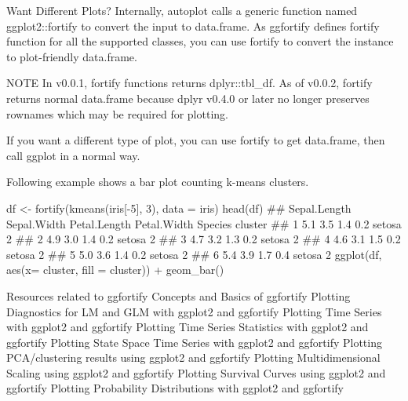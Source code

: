 Want Different Plots?
Internally, autoplot calls a generic function named ggplot2::fortify to convert the input to data.frame. As ggfortify defines fortify function for all the supported classes, you can use fortify to convert the instance to plot-friendly data.frame.

NOTE In v0.0.1, fortify functions returns dplyr::tbl_df. As of v0.0.2, fortify returns normal data.frame because dplyr v0.4.0 or later no longer preserves rownames which may be required for plotting.

If you want a different type of plot, you can use fortify to get data.frame, then call ggplot in a normal way.

Following example shows a bar plot counting k-means clusters.

df <- fortify(kmeans(iris[-5], 3), data = iris)
head(df)
##   Sepal.Length Sepal.Width Petal.Length Petal.Width Species cluster
## 1          5.1         3.5          1.4         0.2  setosa       2
## 2          4.9         3.0          1.4         0.2  setosa       2
## 3          4.7         3.2          1.3         0.2  setosa       2
## 4          4.6         3.1          1.5         0.2  setosa       2
## 5          5.0         3.6          1.4         0.2  setosa       2
## 6          5.4         3.9          1.7         0.4  setosa       2
ggplot(df, aes(x= cluster, fill = cluster)) + geom_bar()


Resources related to ggfortify
Concepts and Basics of ggfortify
Plotting Diagnostics for LM and GLM with ggplot2 and ggfortify
Plotting Time Series with ggplot2 and ggfortify
Plotting Time Series Statistics with ggplot2 and ggfortify
Plotting State Space Time Series with ggplot2 and ggfortify
Plotting PCA/clustering results using ggplot2 and ggfortify
Plotting Multidimensional Scaling using ggplot2 and ggfortify
Plotting Survival Curves using ggplot2 and ggfortify
Plotting Probability Distributions with ggplot2 and ggfortify
　

